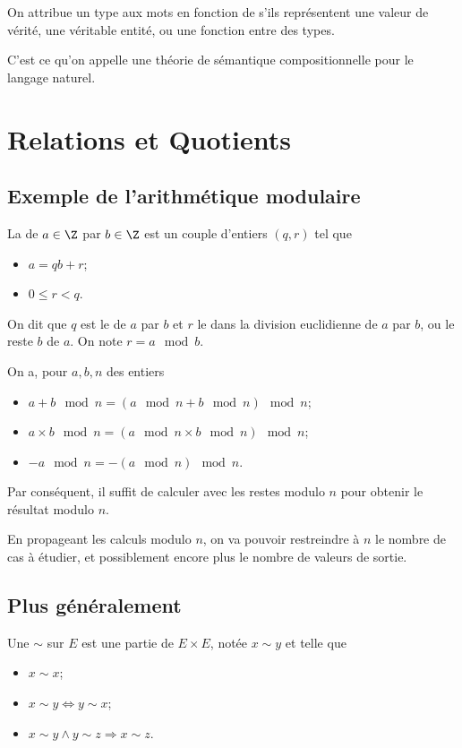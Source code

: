 \documentclass[info, math]{mpb-cours}
\begin{document}
On attribue un type aux mots en fonction de s'ils représentent une valeur de vérité, une véritable entité,
ou une fonction entre des types.

C'est ce qu'on appelle une théorie de sémantique compositionnelle pour le langage naturel.


\section{Relations et Quotients}
\subsection{Exemple de l'arithmétique modulaire}
\begin{definition}
	La  de $a \in \Z$ par $b \in \Z$ est un couple d'entiers $(q, r)$
	tel que
	\begin{itemize}
		\item $a = qb + r$;
		\item $0 \leq r < q$.
	\end{itemize}
	On dit que $q$ est le  de $a$ par $b$ et $r$ le  dans la division
	euclidienne de $a$ par $b$, ou le reste  $b$ de $a$.
	On note $r = a \mod b$.
\end{definition}

\begin{proposition}
	On a, pour $a, b, n$ des entiers
	\begin{itemize}
		\item $a + b \mod n = \left(a \mod n + b \mod n\right) \mod n$;
		\item $a \times b \mod n = \left(a \mod n \times b \mod n\right) \mod n$;
		\item $- a \mod n = - (a \mod n)\mod n$.
	\end{itemize}
\end{proposition}

Par conséquent, il suffit de calculer avec les restes modulo $n$ pour obtenir le résultat modulo $n$.

En propageant les calculs modulo $n$, on va pouvoir restreindre à $n$ le nombre de cas à étudier, et
possiblement encore plus le nombre de valeurs de sortie.

\subsection{Plus généralement}
\begin{definition}
	Une  $\sim$ sur $E$ est une partie de $E\times E$, notée $x \sim y$ et
	telle que
	\begin{itemize}
		\item $x \sim x$;
		\item $x \sim y \Leftrightarrow y \sim x$;
		\item $x \sim y \land y \sim z \Rightarrow x \sim z$.
	\end{itemize}
\end{definition}
\end{document}
